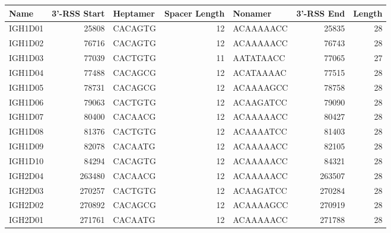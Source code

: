 \begin{tabular}{lrlrlrr}
  \toprule Name & 3'-RSS Start & Heptamer & Spacer Length & Nonamer & 3'-RSS End & Length \\ 
  \midrule IGH1D01 & 25808 & CACAGTG & 12 & ACAAAAACC & 25835 & 28 \\ 
  IGH1D02 & 76716 & CACAGTG & 12 & ACAAAAACC & 76743 & 28 \\ 
  IGH1D03 & 77039 & CACTGTG & 11 & AATATAACC & 77065 & 27 \\ 
  IGH1D04 & 77488 & CACAGCG & 12 & ACATAAAAC & 77515 & 28 \\ 
  IGH1D05 & 78731 & CACAGCG & 12 & ACAAAAGCC & 78758 & 28 \\ 
  IGH1D06 & 79063 & CACTGTG & 12 & ACAAGATCC & 79090 & 28 \\ 
  IGH1D07 & 80400 & CACAACG & 12 & ACAAAAACC & 80427 & 28 \\ 
  IGH1D08 & 81376 & CACTGTG & 12 & ACAAAATCC & 81403 & 28 \\ 
  IGH1D09 & 82078 & CACAATG & 12 & ACAAAAACC & 82105 & 28 \\ 
  IGH1D10 & 84294 & CACAGTG & 12 & ACAAAAACC & 84321 & 28 \\ 
  IGH2D04 & 263480 & CACAACG & 12 & ACAAAAACC & 263507 & 28 \\ 
  IGH2D03 & 270257 & CACTGTG & 12 & ACAAGATCC & 270284 & 28 \\ 
  IGH2D02 & 270892 & CACAGCG & 12 & ACAAAAGCC & 270919 & 28 \\ 
  IGH2D01 & 271761 & CACAATG & 12 & ACAAAAACC & 271788 & 28 \\ 
   \bottomrule \end{tabular}
